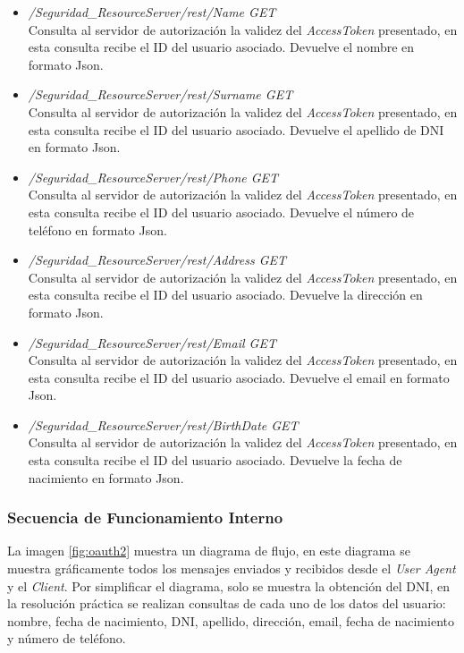 \documentclass[a4,12pt,onecolum]{article}
\begin{document}
\begin{itemize}
\begin{itemize}
		\item \emph{/Seguridad\_ResourceServer/rest/Name	GET} \\
		Consulta al servidor de autorización la validez del \emph{AccessToken} presentado, en esta consulta 			recibe el ID del usuario asociado. Devuelve el nombre en formato Json.
		
		\item \emph{/Seguridad\_ResourceServer/rest/Surname	GET} \\
		Consulta al servidor de autorización la validez del \emph{AccessToken} presentado, en esta consulta 			recibe el ID del usuario asociado. Devuelve el apellido de DNI en formato Json.
		
		\item \emph{/Seguridad\_ResourceServer/rest/Phone	GET} \\
		Consulta al servidor de autorización la validez del \emph{AccessToken} presentado, en esta consulta 			recibe el ID del usuario asociado. Devuelve el número de teléfono en formato Json.
		
		\item \emph{/Seguridad\_ResourceServer/rest/Address	GET} \\
		Consulta al servidor de autorización la validez del \emph{AccessToken} presentado, en esta consulta 			recibe el ID del usuario asociado. Devuelve la dirección en formato Json.
		
		\item \emph{/Seguridad\_ResourceServer/rest/Email	GET} \\
		Consulta al servidor de autorización la validez del \emph{AccessToken} presentado, en esta consulta 			recibe el ID del usuario asociado. Devuelve el email en formato Json.
		
		\item \emph{/Seguridad\_ResourceServer/rest/BirthDate	GET} \\
		Consulta al servidor de autorización la validez del \emph{AccessToken} presentado, en esta consulta 			recibe el ID del usuario asociado. Devuelve la fecha de nacimiento en formato Json.
	\end{itemize}
\end{itemize}


\subsubsection{Secuencia de Funcionamiento Interno}
La imagen \ref{fig:oauth2} muestra un diagrama de flujo, en este diagrama se muestra gráficamente todos los mensajes enviados y recibidos desde el \emph{User Agent} y el \emph{Client}. Por simplificar el diagrama, solo se muestra la obtención del DNI, en la resolución práctica se realizan consultas de cada uno de los datos del usuario: nombre, fecha de nacimiento, DNI, apellido, dirección, email, fecha de nacimiento y número de teléfono.
\end{document}
